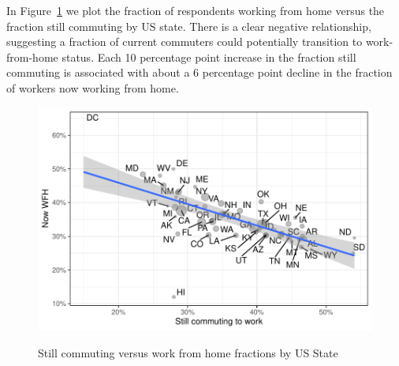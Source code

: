 \documentclass[12pt]{article}
\begin{document}
In Figure~\ref{fig:commute_vs_wfh} we plot the fraction of respondents working from home versus the fraction still commuting by US state.
There is a clear negative relationship, suggesting a fraction of current commuters could potentially transition to work-from-home status.
Each 10 percentage point increase in the fraction still commuting is associated with about a 6 percentage point decline in the fraction of workers now working from home. 

\begin{figure}
  \caption{Still commuting versus work from home fractions by US State} \label{fig:commute_vs_wfh}
\centering
\begin{minipage}{0.8 \linewidth}
  \includegraphics[width = \linewidth]{plots/commute_vs_wfh.pdf} \\
  \begin{footnotesize}
    \end{footnotesize}
\end{minipage}
\end{figure} 
\end{document}
